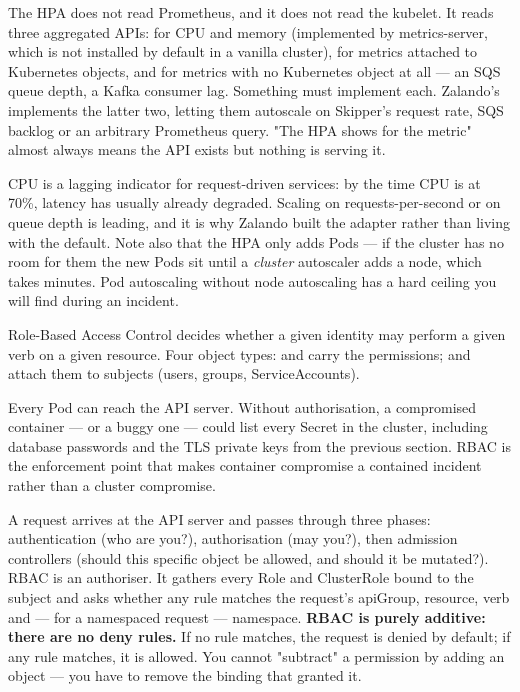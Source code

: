 \begin{behind}
The HPA does not read Prometheus, and it does not read the kubelet. It reads three aggregated APIs:  for CPU and memory (implemented by metrics-server, which is not installed by default in a vanilla cluster),  for metrics attached to Kubernetes objects, and  for metrics with no Kubernetes object at all --- an SQS queue depth, a Kafka consumer lag. Something must implement each. Zalando's  implements the latter two, letting them autoscale on Skipper's request rate, SQS backlog or an arbitrary Prometheus query. "The HPA shows  for the metric" almost always means the API exists but nothing is serving it.
\end{behind}

\begin{scalenote}
CPU is a lagging indicator for request-driven services: by the time CPU is at 70\%, latency has usually already degraded. Scaling on requests-per-second or on queue depth is leading, and it is why Zalando built the adapter rather than living with the default. Note also that the HPA only adds Pods --- if the cluster has no room for them the new Pods sit  until a \emph{cluster} autoscaler adds a node, which takes minutes. Pod autoscaling without node autoscaling has a hard ceiling you will find during an incident.
\end{scalenote}


 Role-Based Access Control decides whether a given identity may perform a given verb on a given resource. Four object types:  and  carry the permissions;  and  attach them to subjects (users, groups, ServiceAccounts).

 Every Pod can reach the API server. Without authorisation, a compromised container --- or a buggy one --- could list every Secret in the cluster, including database passwords and the TLS private keys from the previous section. RBAC is the enforcement point that makes container compromise a contained incident rather than a cluster compromise.

 A request arrives at the API server and passes through three phases: authentication (who are you?), authorisation (may you?), then admission controllers (should this specific object be allowed, and should it be mutated?). RBAC is an authoriser. It gathers every Role and ClusterRole bound to the subject and asks whether any rule matches the request's apiGroup, resource, verb and --- for a namespaced request --- namespace. \textbf{RBAC is purely additive: there are no deny rules.} If no rule matches, the request is denied by default; if any rule matches, it is allowed. You cannot "subtract" a permission by adding an object --- you have to remove the binding that granted it.

